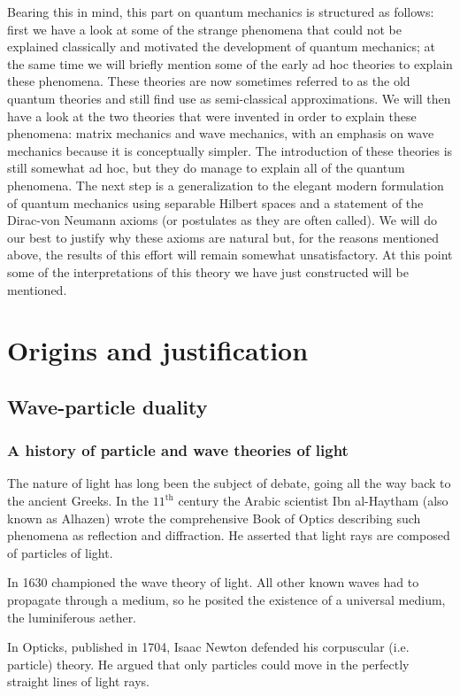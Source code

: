 Bearing this in mind, this part on quantum mechanics is structured as follows: first we have a look at some of the strange phenomena that could not be explained classically and motivated the development of quantum mechanics; at the same time we will briefly mention some of the early ad hoc theories to explain these phenomena. These theories are now sometimes referred to as the old quantum theories and still find use as semi-classical approximations. We will then have a look at the two theories that were invented in order to explain these phenomena: matrix mechanics and wave mechanics, with an emphasis on wave mechanics because it is conceptually simpler. The introduction of these theories is still somewhat ad hoc, but they do manage to explain all of the quantum phenomena. The next step is a generalization to the elegant modern formulation of quantum mechanics using separable Hilbert spaces and a statement of the Dirac-von Neumann axioms (or postulates as they are often called). We will do our best to justify why these axioms are natural but, for the reasons mentioned above, the results of this effort will remain somewhat unsatisfactory. At this point some of the interpretations of this theory we have just constructed will be mentioned.

\chapter{Origins and justification}
\section{Wave-particle duality}
\subsection{A history of particle and wave theories of light}
The nature of light has long been the subject of debate, going all the way back to the ancient Greeks. In the $11^\text{th}$ century the Arabic scientist Ibn al-Haytham (also known as Alhazen) wrote the comprehensive Book of Optics describing such phenomena as reflection and diffraction. He asserted that light rays are composed of particles of light.

In 1630 championed the wave theory of light. All other known waves had to propagate through a medium, so he posited the existence of a universal medium, the luminiferous aether.

In Opticks, published in 1704, Isaac Newton defended his corpuscular (i.e. particle) theory. He argued that only particles could move in the perfectly straight lines of light rays.

